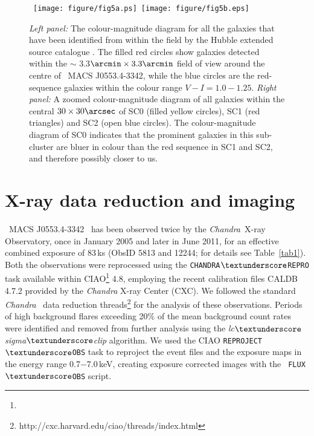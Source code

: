 \documentclass[useASM,usenatbib]{mn2e}
\newcommand\chandra{{\it Chandra}}
\newcommand{\mac}{\rm~MACS J0553.4-3342}
\begin{document}
\begin{figure*}
\center
\hbox
{
\texttt{[image: figure/fig5a.ps]}
\texttt{[image: figure/fig5b.eps]}
}
\caption{{\it Left panel:} 
  {The colour-magnitude diagram for all the galaxies that have been
  identified from within the field by the Hubble extended source
  catalogue \protect\citep{2015IAUGA..2247054W}. The filled red circles show galaxies detected within the
  $\sim$ 3.3$\arcmin \times 3.3\arcmin$ field of view around the
  centre of \mac, while the blue circles are the red-sequence galaxies   within the colour range $V-I=1.0-1.25$.} {\it Right panel:} A zoomed colour-magnitude diagram of all galaxies within the central
$30\times 30 \arcsec$ of SC0 (filled yellow circles), SC1 (red
triangles) and SC2 (open blue circles).  The colour-magnitude diagram
of SC0 indicates that the prominent galaxies in this sub-cluster are
bluer in colour than the red sequence in SC1 and SC2, and therefore
possibly closer to us.}
  \label{cmdzoom}
\end{figure*}


\section[2]{X-ray data reduction and imaging}
\mac~ has been observed twice by the \chandra\ X-ray Observatory, once in January 2005 and later in June 2011, for an effective combined
exposure of 83\,ks (ObsID 5813 and 12244; for details see
Table~\ref{tab1}). Both the observations were reprocessed using the
\texttt{{CHANDRA$\textunderscore$REPRO}} task available within
CIAO\footnote{} 4.8,
employing the recent calibration files CALDB 4.7.2 provided by the
{\it Chandra} X-ray Center (CXC). We followed the standard \chandra~
data reduction threads\footnote{\color{blue}
  {http://cxc.harvard.edu/ciao/threads/index.html}} for the analysis
of these observations. Periods of high background flares exceeding
20\% of the mean background count rates were identified and removed
from further analysis using the {\it
  lc$\textunderscore$sigma$\textunderscore$clip} algorithm. We used
the CIAO {\tt REPROJECT$\textunderscore$OBS} task to reproject the
event files and the exposure maps in the energy range 0.7$-$7.0\,keV,
creating exposure corrected images with the {\tt
  FLUX$\textunderscore$OBS} script.
\end{document}
